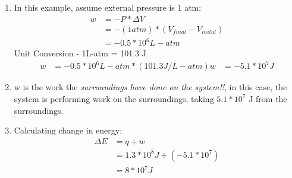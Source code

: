 \documentclass{article}  %
\begin{document}
\begin{enumerate}
    \item In this example, assume external pressure is 1 atm:
        \begin{equation*}
            \begin{aligned}
                w &= -P * \Delta V \\
                  &= -(1atm)*(V_{final}-V_{inital}) \\
                  &= -0.5*10^6L-atm
            \end{aligned}
        \end{equation*}
        Unit Conversion - 1L-atm = 101.3 J
        \begin{equation*}
            \begin{aligned}
                w &= -0.5 * 10^6L-atm * (101.3 J/L-atm)
                w &= -5.1*10^7 J 
            \end{aligned}
        \end{equation*}
    \item w is the work the \emph{surroundings have done on the system!!}, in this case, the system is performing work on the surroundings, taking $5.1*10^7$ J from the surroundings.
    \item Calculating change in energy:
        \begin{equation*}
            \begin{aligned}
                \Delta E &= q + w \\
                    &= 1.3*10^8J + (-5.1*10^7) \\
                    &= 8*10^7J
            \end{aligned}
        \end{equation*}
\end{enumerate}
\end{document}
